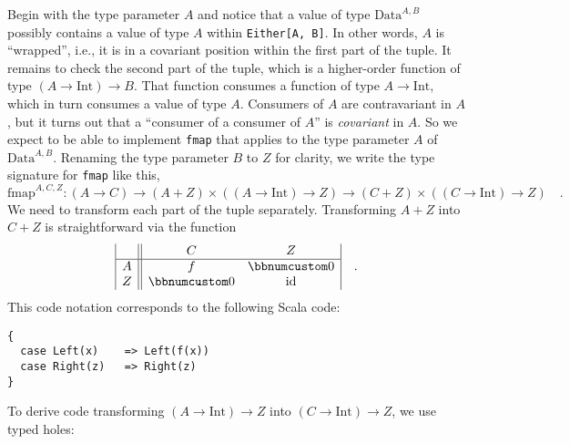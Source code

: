 Begin with the type parameter $A$ and notice that a value of type
$\text{Data}^{A,B}$ possibly contains a value of type $A$ within
\lstinline!Either[A, B]!. In other words, $A$ is \textsf{``}wrapped\textsf{''},
i.e., it is in a covariant position within the first part of the tuple.
It remains to check the second part of the tuple, which is a higher-order
function of type $\left(A\rightarrow\text{Int}\right)\rightarrow B$.
That function consumes a function of type $A\rightarrow\text{Int}$,
which in turn consumes a value of type $A$. Consumers of $A$ are
contravariant in $A$, but it turns out that a \textsf{``}consumer of a consumer
of $A$\textsf{''} is \emph{covariant} in $A$. So we expect to be able to
implement \lstinline!fmap! that applies to the type parameter $A$
of $\text{Data}^{A,B}$. Renaming the type parameter $B$ to $Z$
for clarity, we write the type signature for \lstinline!fmap! like
this,
\[
\text{fmap}^{A,C,Z}:\left(A\rightarrow C\right)\rightarrow\left(A+Z\right)\times\left(\left(A\rightarrow\text{Int}\right)\rightarrow Z\right)\rightarrow\left(C+Z\right)\times\left(\left(C\rightarrow\text{Int}\right)\rightarrow Z\right)\quad.
\]
We need to transform each part of the tuple separately. Transforming
$A+Z$ into $C+Z$ is straightforward via the function
\[
\begin{array}{|c||cc|}
 & C & Z\\
\hline A & f & \bbnum 0\\
Z & \bbnum 0 & \text{id}
\end{array}\quad.
\]
This code notation corresponds to the following Scala code:
\begin{lstlisting}
{
  case Left(x)    => Left(f(x))
  case Right(z)   => Right(z)
}
\end{lstlisting}
To derive code transforming $\left(A\rightarrow\text{Int}\right)\rightarrow Z$
into $\left(C\rightarrow\text{Int}\right)\rightarrow Z$, we use typed
holes:
